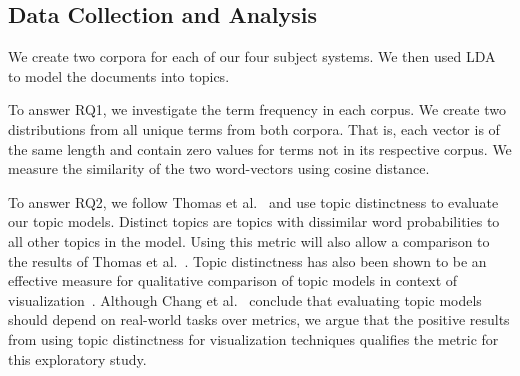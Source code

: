 \subsection{Data Collection and Analysis}

We create two corpora for each of our four subject systems.
We then used LDA to model the documents into topics.

To answer RQ1, we investigate the term frequency in each corpus.
We create two distributions from all unique terms from both corpora.
That is, each vector is of the same length and contain zero values for terms not in its respective corpus.
We measure the similarity of the two word-vectors using cosine distance.

To answer RQ2, we follow Thomas et al.~\cite{Thomas-etal:2011}
and use topic distinctness to evaluate our topic models.
Distinct topics are topics with dissimilar word probabilities to all other topics in the model.
Using this metric will also allow a comparison to the results of Thomas et al.~\cite{Thomas-etal:2011}.
Topic distinctness has also been shown to be an effective measure for qualitative
comparison of topic models in context of visualization~\cite{Wei-etal:2010, Chuang-etal:2012}.
Although Chang et al.~\cite{Chang-etal:2009} conclude that evaluating topic models
should depend on real-world tasks over metrics,
we argue that the positive results from using topic distinctness for visualization
techniques qualifies the metric for this exploratory study.


